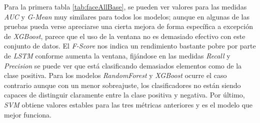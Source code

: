 Para la primera tabla \ref{tab:faceAllBase}, se pueden ver valores para las medidas \textit{AUC} y \textit{G-Mean} muy similares para todos los modelos; aunque en algunas de las pruebas pueda verse apreciarse una cierta mejora de forma específica a excepción de \textit{XGBoost}, parece que el uso de la ventana no es demasiado efectivo con este conjunto de datos. El \textit{F-Score} nos indica un rendimiento bastante pobre por parte de \textit{LSTM} conforme aumenta la ventana, fijándose en las medidas \textit{Recall} y \textit{Precision} se puede ver que está clasificando demasiados elementos como de la clase positiva. Para los modelos \textit{RandomForest} y \textit{XGBoost} ocurre el caso contrario aunque con un menor sobreajuste, los clasificadores no están siendo capaces de distinguir claramente entre la clase positiva y negativa. Por último, \textit{SVM} obtiene valores estables para las tres métricas anteriores y es el modelo que mejor funciona.\newline

